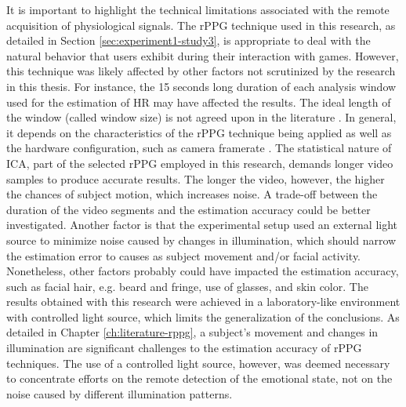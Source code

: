 It is important to highlight the technical limitations associated with the remote acquisition of physiological signals. The rPPG technique used in this research, as detailed in Section \ref{sec:experiment1-study3}, is appropriate to deal with the natural behavior that users exhibit during their interaction with games. However, this technique was likely affected by other factors not scrutinized by the research in this thesis. For instance, the 15 seconds long duration of each analysis window used for the estimation of HR may have affected the results. The ideal length of the window (called window size) is not agreed upon in the literature \parencite{rouast2016remote}. In general, it depends on the characteristics of the rPPG technique being applied as well as the hardware configuration, such as camera framerate \parencite{roald2013estimation}. The statistical nature of ICA, part of the selected rPPG employed in this research, demands longer video samples to produce accurate results. The longer the video, however, the higher the chances of subject motion, which increases noise. A trade-off between the duration of the video segments and the estimation accuracy could be better investigated. Another factor is that the experimental setup used an external light source to minimize noise caused by changes in illumination, which should narrow the estimation error to causes as subject movement and/or facial activity. Nonetheless, other factors probably could have impacted the estimation accuracy, such as facial hair, e.g. beard and fringe, use of glasses, and skin color. The results obtained with this research were achieved in a laboratory-like environment with controlled light source, which limits the generalization of the conclusions. As detailed in Chapter \ref{ch:literature-rppg}, a subject's movement and changes in illumination are significant challenges to the estimation accuracy of rPPG techniques. The use of a controlled light source, however, was deemed necessary to concentrate efforts on the remote detection of the emotional state, not on the noise caused by different illumination patterns.

